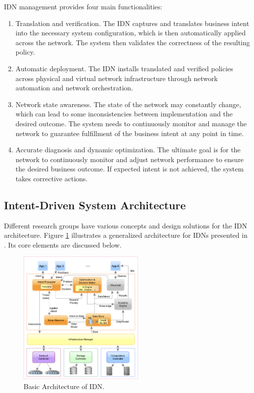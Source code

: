 IDN management provides four main functionalities: \cite[271]{Wei2020}

\begin{enumerate}
	\item Translation and verification. The IDN captures and translates business intent into the necessary system configuration, which is then automatically applied across the network. The system then validates the correctness of the resulting policy.
	\item Automatic deployment. The IDN installs translated and verified policies across physical and virtual network infrastructure through network automation and network orchestration.
	\item Network state awareness. The state of the network may constantly change, which can lead to some inconsistencies between implementation and the desired outcome. The system needs to continuously monitor and manage the network to guarantee fulfillment of the business intent at any point in time.
	\item Accurate diagnosis and dynamic optimization. The ultimate goal is for the network to continuously monitor and adjust network performance to ensure the desired business outcome. If expected intent is not achieved, the system takes corrective actions.
\end{enumerate}


\subsection{Intent-Driven System Architecture}

Different research groups have various concepts and design solutions for the IDN architecture. Figure \ref{fig:IDN_Architecture} illustrates a generalized architecture for IDNs presented in \cite[3]{Saha2018}. Its core elements are discussed below.  

\begin{figure}[htb]
  \centering
  \includegraphics[width=0.55\textwidth]{figures/IBN_Architecture.png}
  \caption{Basic Architecture of IDN. \cite{Saha2018}}
  \label{fig:IDN_Architecture}
\end{figure}

